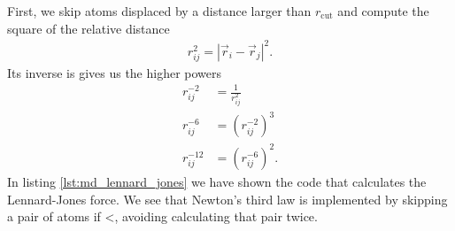 First, we skip atoms displaced by a distance larger than $r_\text{cut}$ and compute the square of the relative distance
\begin{align}
	r_{ij}^2 = \left|\vec r_i - \vec r_j\right|^2.
\end{align}
Its inverse is gives us the higher powers
\begin{align}
	r_{ij}^{-2} &= \frac{1}{r_{ij}^2}\\
	r_{ij}^{-6} &= \left(r_{ij}^{-2}\right)^3\\
	r_{ij}^{-12} &= \left(r_{ij}^{-6}\right)^2.
\end{align}
In listing \ref{lst:md_lennard_jones} we have shown the code that calculates the Lennard-Jones force. We see that Newton's third law is implemented by skipping a pair of atoms if <, avoiding calculating that pair twice. 
